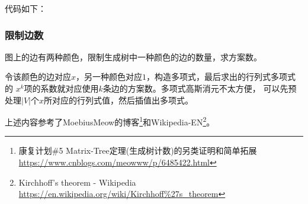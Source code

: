 代码如下：


\subsubsection{限制边数}
图上的边有两种颜色，限制生成树中一种颜色的边的数量，求方案数。

令该颜色的边对应$x$，另一种颜色对应$1$，构造多项式，最后求出的行列式多项式的
$x^k$项的系数就对应使用$k$条边的方案数。多项式高斯消元不太方便，
可以先预处理$|V|$个$x$所对应的行列式值，然后插值出多项式。

上述内容参考了MoebiusMeow的博客\footnote{
	康复计划\#5 Matrix-Tree定理(生成树计数)的另类证明和简单拓展
	\url{https://www.cnblogs.com/meowww/p/6485422.html}
}和Wikipedia-EN\footnote{
	Kirchhoff's theorem - Wikipedia\\
	\url{https://en.wikipedia.org/wiki/Kirchhoff\%27s\_theorem}
}。
